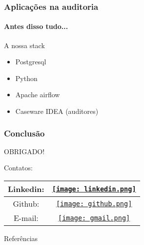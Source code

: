 \documentclass[aspectratio=169]{beamer}
\begin{document}
\begin{frame}
    \frametitle{Aplicações na auditoria}
    \framesubtitle{Antes disso tudo...}
    \begin{block}{A nossa stack}
        \begin{itemize}
            \item Postgresql
            \item Python
            \item Apache airflow
            \item Caseware IDEA (auditores)
        \end{itemize}
    \end{block}
\end{frame}


\begin{frame}
    \frametitle{Conclusão}
    \centering
        OBRIGADO!\\
        \begin{block}{}
            Contatos:
        \end{block}


    \begin{tabular}{cc}
        Linkedin: & \href{https://www.linkedin.com/in/alexandre-castro-45593415a/}{\texttt{[image: linkedin.png]}}\\
        \hline
        Github:  & \href{https://www.github.com/im-alexandre}{\texttt{[image: github.png]}}\\
        \hline
        E-mail:  &  \href{mailto:im.alexandre07@gmail.com}{\texttt{[image: gmail.png]}}\\
        \hline
    \end{tabular}
\end{frame}

\begin{frame}{Referências}


\end{frame}
\end{document}
